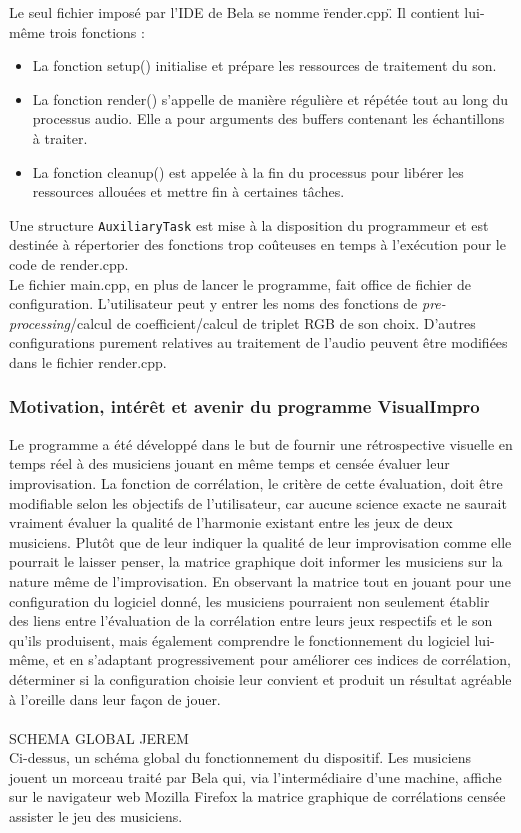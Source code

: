 Le seul fichier imposé par l'IDE de Bela se nomme \"render.cpp\". Il
contient lui-même trois fonctions :
\begin{itemize}
 \item La fonction setup() initialise et prépare les ressources de
       traitement du son.
 \item La fonction render() s'appelle de manière régulière et répétée
       tout au long du processus audio. Elle a pour arguments des buffers
       contenant les échantillons à traiter.
 \item La fonction cleanup() est appelée à la fin du processus pour
       libérer les ressources allouées et mettre fin à certaines tâches.
\end{itemize}

Une structure \verb!AuxiliaryTask! est mise à la disposition du
programmeur et est destinée à répertorier des fonctions trop coûteuses
en temps à l'exécution pour le code de render.cpp. \\

Le fichier main.cpp, en plus de lancer le programme, fait office de
fichier de configuration. L'utilisateur peut y entrer les noms des
fonctions de \textit{pre-processing}/calcul de coefficient/calcul de
triplet RGB de son choix. D'autres configurations purement relatives
au traitement de l'audio peuvent être modifiées dans le fichier
render.cpp.

\subsubsection{Motivation, intérêt et avenir du programme VisualImpro}
Le programme a été développé dans le but de fournir une rétrospective
visuelle en temps réel à des musiciens jouant en même temps et censée
évaluer leur improvisation. La fonction de corrélation, le critère de
cette évaluation, doit être modifiable selon les objectifs de
l'utilisateur, car aucune science exacte ne saurait vraiment évaluer
la qualité de l'harmonie existant entre les jeux de deux
musiciens. Plutôt que de leur indiquer la qualité de leur
improvisation comme elle pourrait le laisser penser, la matrice
graphique doit informer les musiciens sur la nature même de
l'improvisation. En observant la matrice tout en jouant pour une
configuration du logiciel donné, les musiciens pourraient non
seulement établir des liens entre l'évaluation de la corrélation entre
leurs jeux respectifs et le son qu'ils produisent, mais également
comprendre le fonctionnement du logiciel lui-même, et en s'adaptant
progressivement pour améliorer ces indices de corrélation, déterminer
si la configuration choisie leur convient et produit un résultat
agréable à l'oreille dans leur façon de jouer. \\
\\
SCHEMA GLOBAL JEREM
\\
Ci-dessus, un schéma global du fonctionnement du dispositif. Les
musiciens jouent un morceau traité par Bela qui, via l'intermédiaire
d'une machine, affiche sur le navigateur web Mozilla Firefox la
matrice graphique de corrélations censée assister le jeu des
musiciens. \\

